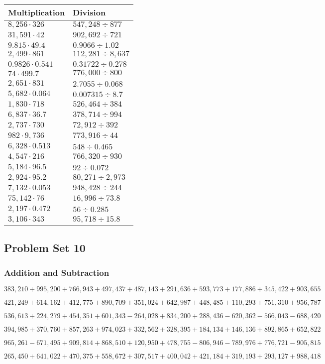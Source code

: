 \begin{longtable}[]{@{}ll@{}}
\toprule
Multiplication & Division\tabularnewline
\midrule
\endhead
\(8,256\cdot326\) & \(547,248÷877\)\tabularnewline
\(31,591\cdot42\) & \(902,692÷721\)\tabularnewline
\(9.815\cdot49.4\) & \(0.9066÷1.02\)\tabularnewline
\(2,499\cdot861\) & \(112,281÷8,637\)\tabularnewline
\(0.9826\cdot0.541\) & \(0.31722÷0.278\)\tabularnewline
\(74\cdot499.7\) & \(776,000÷800\)\tabularnewline
\(2,651\cdot831\) & \(2.7055÷0.068\)\tabularnewline
\(5,682\cdot0.064\) & \(0.007315÷8.7\)\tabularnewline
\(1,830\cdot718\) & \(526,464÷384\)\tabularnewline
\(6,837\cdot36.7\) & \(378,714÷994\)\tabularnewline
\(2,737\cdot730\) & \(72,912÷392\)\tabularnewline
\(982\cdot9,736\) & \(773,916÷44\)\tabularnewline
\(6,328\cdot0.513\) & \(548÷0.465\)\tabularnewline
\(4,547\cdot216\) & \(766,320÷930\)\tabularnewline
\(5,184\cdot96.5\) & \(92÷0.072\)\tabularnewline
\(2,924\cdot95.2\) & \(80,271÷2,973\)\tabularnewline
\(7,132\cdot0.053\) & \(948,428÷244\)\tabularnewline
\(75,142\cdot76\) & \(16,996÷73.8\)\tabularnewline
\(2,197\cdot0.472\) & \(56÷0.285\)\tabularnewline
\(3,106\cdot343\) & \(95,718÷15.8\)\tabularnewline
\bottomrule
\end{longtable}

\hypertarget{problem-set-10-5}{%
\subsection{Problem Set 10}\label{problem-set-10-5}}

\hypertarget{addition-and-subtraction-315}{%
\subsubsection{Addition and
Subtraction}\label{addition-and-subtraction-315}}

\(383,210+995,200+766,943+497,437+487,143+291,636+593,773+177,886+345,422+ 903,655\)

\(421,249+614,162+412,775+890,709+351,024+642,987+448,485+110,293+751,310+956,787\)

\(536,613+224,279+454,351+601,343-264,028+834,200+288,436-620,362-566,043-688,420\)

\(394,985+370,760+857,263+974,023+332,562+328,395+184,134+146,136+892,865+652,822\)

\(965,261-671,495+909,814+868,510+120,950+478,755-806,946-789,976+776,721-905,815\)

\(265,450+641,022+470,375+558,672+307,517+400,042+421,184+319,193+293,127+988,418\)

